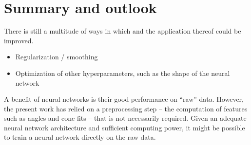 \chapter{Summary and outlook} \label{sec:summary}





There is still a multitude of ways in which \dsea{} and the application thereof could be improved.
\begin{itemize}
  \item Regularization / smoothing
  \item Optimization of other hyperparameters, such as the shape of the neural network
\end{itemize}

A benefit of neural networks is their good performance on \enquote{raw} data.
However,
the present work has relied on a preprocessing step %
  – the computation of features such as angles and cone fits –
that is not necessarily required.
Given an adequate neural network architecture and sufficient computing power,
it might be possible to train a neural network directly on the raw data.


\blindtext[3]
